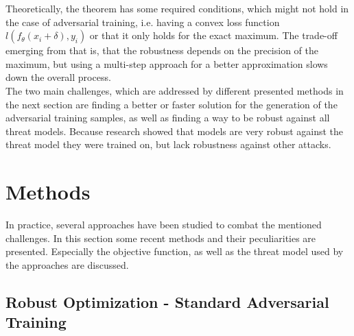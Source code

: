 \documentclass[conference]{IEEEtran}
\begin{document}
Theoretically, the theorem has some required conditions, which might not hold in the case of adversarial training, i.e. having a convex loss function $l(f_{\theta}(x_i + \delta), y_i)$ or that it only holds for the exact maximum. The trade-off emerging from that is, that the robustness depends on the precision of the maximum, but using a multi-step approach for a better approximation slows down the overall process. \\
The two main challenges, which are addressed by different presented methods in the next section are finding a better or faster solution for the generation of the adversarial training samples, as well as finding a way to be robust against all threat models. Because research showed that models are very robust against the threat model they were trained on, but lack robustness against other attacks.

\section{Methods}

In practice, several approaches have been studied to combat the mentioned challenges. In this section some recent methods and their peculiarities are presented. Especially the objective function, as well as the threat model used by the approaches are discussed.

\subsection{Robust Optimization - Standard Adversarial Training} \label{Robust Opti}
\end{document}
